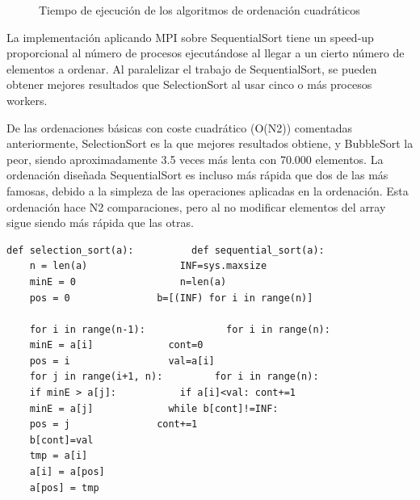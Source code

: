 \begin{figure}[h]
	\centering
	\caption{Tiempo de ejecución de los algoritmos de ordenación cuadráticos}
\end{figure}

La implementación aplicando MPI sobre SequentialSort tiene un speed-up proporcional al número de procesos ejecutándose al llegar a un cierto número de elementos a ordenar.  %
Al paralelizar el trabajo de SequentialSort, se pueden obtener mejores resultados que SelectionSort al usar cinco o más procesos workers.

De las ordenaciones básicas con coste cuadrático (O(N2)) comentadas anteriormente, SelectionSort es la que mejores resultados obtiene, y BubbleSort la peor, siendo aproximadamente 3.5 veces más lenta con 70.000 elementos. 
La ordenación diseñada SequentialSort es incluso más rápida que dos de las más famosas, debido a la simpleza de las operaciones aplicadas en la ordenación. Esta ordenación hace N2 comparaciones, pero al no modificar elementos del array sigue siendo más rápida que las otras.


\begin{lstlisting}[frame=single]
	def selection_sort(a):			def sequential_sort(a):
	n = len(a)				  INF=sys.maxsize
	minE = 0				  n=len(a)
	pos = 0			  	  b=[(INF) for i in range(n)]  
	
	for i in range(n-1):			  for i in range(n):
	minE = a[i]			    cont=0
	pos = i				    val=a[i]
	for j in range(i+1, n):		    for i in range(n):  
	if minE > a[j]:		      if a[i]<val: cont+=1
	minE = a[j]				while b[cont]!=INF: 
	pos = j				  cont+=1
	b[cont]=val
	tmp = a[i]
	a[i] = a[pos]
	a[pos] = tmp
	
\end{lstlisting}
\newpage

